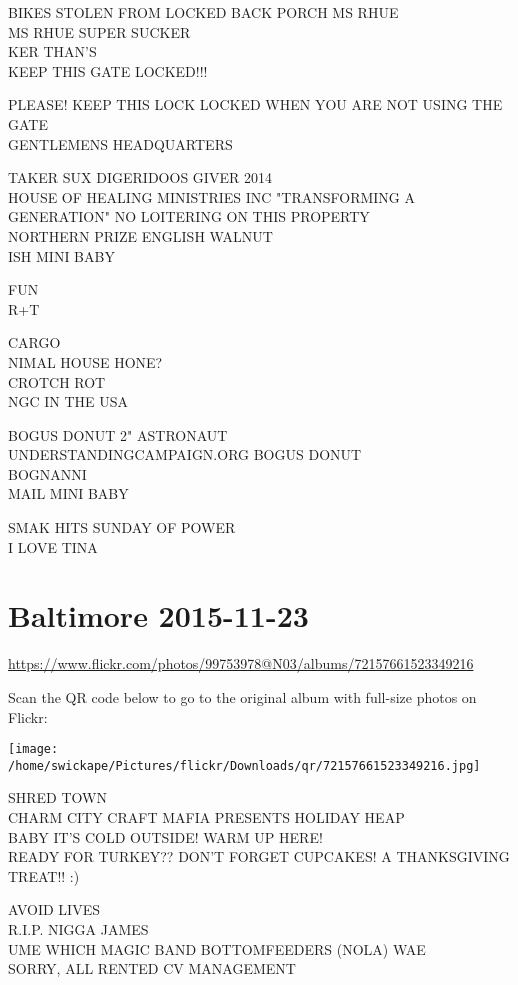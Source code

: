 \documentclass[10pt,letterpaper]{article}
\begin{document}
BIKES STOLEN FROM LOCKED BACK PORCH MS RHUE\\
MS RHUE SUPER SUCKER\\
KER THAN'S\\
KEEP THIS GATE LOCKED!!!

PLEASE!  KEEP THIS LOCK LOCKED WHEN YOU ARE NOT USING THE GATE\\
GENTLEMENS HEADQUARTERS

TAKER SUX DIGERIDOOS GIVER 2014\\
HOUSE OF HEALING MINISTRIES INC "TRANSFORMING A GENERATION" NO LOITERING ON THIS PROPERTY\\
NORTHERN PRIZE ENGLISH WALNUT\\
ISH MINI BABY

FUN\\
R+T

CARGO\\
NIMAL HOUSE HONE?\\
CROTCH ROT\\
NGC IN THE USA

BOGUS DONUT 2" ASTRONAUT\\
UNDERSTANDINGCAMPAIGN.ORG BOGUS DONUT\\
BOGNANNI\\
MAIL MINI BABY

SMAK HITS SUNDAY OF POWER\\
I LOVE TINA


\section*{Baltimore 2015-11-23}

\url{https://www.flickr.com/photos/99753978@N03/albums/72157661523349216}

Scan the QR code below to go to the original album with full-size photos on Flickr:

\texttt{[image: /home/swickape/Pictures/flickr/Downloads/qr/72157661523349216.jpg]}


SHRED TOWN\\
CHARM CITY CRAFT MAFIA PRESENTS HOLIDAY HEAP\\
BABY IT'S COLD OUTSIDE!  WARM UP HERE!\\
READY FOR TURKEY??  DON'T FORGET CUPCAKES!  A THANKSGIVING TREAT!! :)

AVOID LIVES\\
R.I.P. NIGGA JAMES\\
UME WHICH MAGIC BAND BOTTOMFEEDERS (NOLA) WAE\\
SORRY, ALL RENTED CV MANAGEMENT
\end{document}
